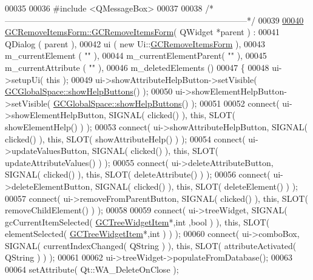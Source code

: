 \begin{DoxyCode}
00035 
00036 \textcolor{preprocessor}{#include <QMessageBox>}
00037 
00038 \textcolor{comment}{/*
      --------------------------------------------------------------------------------------*/}
00039 
\hypertarget{gcremoveitemsform_8cpp_source_l00040}{}\hyperlink{class_g_c_remove_items_form_a8ef59eb50c10a50f70ef268110916d39}{00040} \hyperlink{class_g_c_remove_items_form_a8ef59eb50c10a50f70ef268110916d39}{GCRemoveItemsForm::GCRemoveItemsForm}( QWidget *parent ) :
00041   QDialog               ( parent ),
00042   ui                    ( new Ui::\hyperlink{class_g_c_remove_items_form}{GCRemoveItemsForm} ),
00043   m\_currentElement      ( \textcolor{stringliteral}{""} ),
00044   m\_currentElementParent( \textcolor{stringliteral}{""} ),
00045   m\_currentAttribute    ( \textcolor{stringliteral}{""} ),
00046   m\_deletedElements     ()
00047 \{
00048   ui->setupUi( \textcolor{keyword}{this} );
00049   ui->showAttributeHelpButton->setVisible( \hyperlink{namespace_g_c_global_space_a981753e55f0f77f981f67ccb1ad4ecf1}{GCGlobalSpace::showHelpButtons}() );
00050   ui->showElementHelpButton->setVisible( \hyperlink{namespace_g_c_global_space_a981753e55f0f77f981f67ccb1ad4ecf1}{GCGlobalSpace::showHelpButtons}() );
00051 
00052   connect( ui->showElementHelpButton,   SIGNAL( clicked() ), \textcolor{keyword}{this}, SLOT( 
      showElementHelp() ) );
00053   connect( ui->showAttributeHelpButton, SIGNAL( clicked() ), \textcolor{keyword}{this}, SLOT( 
      showAttributeHelp() ) );
00054   connect( ui->updateValuesButton,      SIGNAL( clicked() ), \textcolor{keyword}{this}, SLOT( 
      updateAttributeValues() ) );
00055   connect( ui->deleteAttributeButton,   SIGNAL( clicked() ), \textcolor{keyword}{this}, SLOT( 
      deleteAttribute() ) );
00056   connect( ui->deleteElementButton,     SIGNAL( clicked() ), \textcolor{keyword}{this}, SLOT( 
      deleteElement() ) );
00057   connect( ui->removeFromParentButton,  SIGNAL( clicked() ), \textcolor{keyword}{this}, SLOT( 
      removeChildElement() ) );
00058 
00059   connect( ui->treeWidget, SIGNAL( gcCurrentItemSelected( \hyperlink{class_g_c_tree_widget_item}{GCTreeWidgetItem}*,\textcolor{keywordtype}{int}
      ,\textcolor{keywordtype}{bool} ) ), \textcolor{keyword}{this}, SLOT( elementSelected( \hyperlink{class_g_c_tree_widget_item}{GCTreeWidgetItem}*,\textcolor{keywordtype}{int} ) ) );
00060   connect( ui->comboBox, SIGNAL( currentIndexChanged( QString ) ), \textcolor{keyword}{this}, SLOT( 
      attributeActivated( QString ) ) );
00061 
00062   ui->treeWidget->populateFromDatabase();
00063 
00064   setAttribute( Qt::WA\_DeleteOnClose );

\end{DoxyCode}
